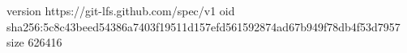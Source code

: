 version https://git-lfs.github.com/spec/v1
oid sha256:5c8c43beed54386a7403f19511d157efd561592874ad67b949f78db4f53d7957
size 626416
